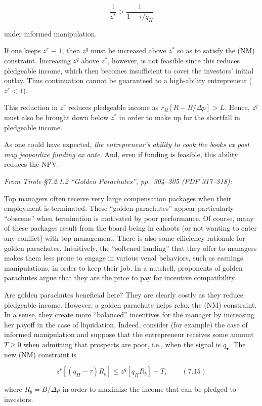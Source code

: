 \documentclass[11pt,a4paper]{article}
\begin{document}
\[\frac{1}{z^*} > \frac{1}{1 - \tau/q_H}\]

under informed manipulation.

If one keeps \(z^r \equiv 1\), then \(z^q\) must be increased above \(z^*\) so as to satisfy the
(NM) constraint. Increasing \(z^q\) above \(z^*\), however, is not feasible since this reduces
pledgeable income, which then becomes insufficient to cover the investors' initial outlay. Thus
continuation cannot be guaranteed to a high-ability entrepreneur (\(z^r < 1\)).

This reduction in \(z^r\) reduces pledgeable income as \(r_H[R - B/\Delta p] > L\). Hence, \(z^q\)
must also be brought down below \(z^*\) in order to make up for the shortfall in pledgeable income.

As one could have expected, \emph{the entrepreneur's ability to cook the books ex post may
jeopardize funding ex ante.} And, even if funding is feasible, this ability reduces the NPV.

\emph{From Tirole §7.2.1.2 ``Golden Parachutes'', pp.~304--305 (PDF 317--318):}

Top managers often receive very large compensation packages when their employment is terminated.
These ``golden parachutes'' appear particularly ``obscene'' when termination is motivated by poor
performance. Of course, many of these packages result from the board being in cahoots (or not
wanting to enter any conflict) with top management. There is also some efficiency rationale for
golden parachutes. Intuitively, the ``softened landing'' that they offer to managers makes them less
prone to engage in various venal behaviors, such as earnings manipulations, in order to keep their
job. In a nutshell, proponents of golden parachutes argue that they are the price to pay for
incentive compatibility.

Are golden parachutes beneficial here? They are clearly costly as they reduce pledgeable income.
However, a golden parachute helps relax the (NM) constraint. In a sense, they create more
``balanced'' incentives for the manager by increasing her payoff in the case of liquidation. Indeed,
consider (for example) the case of informed manipulation and suppose that the entrepreneur receives
some amount \(T \geqslant 0\) when admitting that prospects are poor, i.e., when the signal is
\(q_\bullet\). The new (NM) constraint is

\[z^r[(q_H - \tau)R_b] \leqslant z^q[q_H R_b] + T, \qquad (7.15)\]

where \(R_b = B/\Delta p\) in order to maximize the income that can be pledged to investors.
\end{document}
